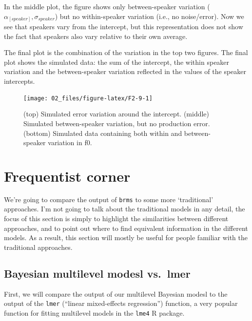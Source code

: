 \documentclass[
]{book}
\begin{document}
In the middle plot, the figure shows only between-speaker variation (\(\alpha_{[speaker]}, \sigma_{speaker}\)) but no within-speaker variation (i.e., no noise/error). Now we see that speakers vary from the intercept, but this representation does not show the fact that speakers also vary relative to their own average.

The final plot is the combination of the variation in the top two figures. The final plot shows the simulated data: the sum of the intercept, the within speaker variation and the between-speaker variation reflected in the values of the speaker intercepts.

\begin{figure}

{\centering \texttt{[image: 02\_files/figure-latex/F2-9-1]} 

}

\caption{(top) Simulated error variation around the intercept. (middle) Simulated between-speaker variation, but no production error. (bottom) Simulated data containing both within and between-speaker variation in f0.}\label{fig:F2-9}
\end{figure}

\hypertarget{frequentist-corner}{%
\section{Frequentist corner}\label{frequentist-corner}}

We're going to compare the output of \texttt{brms} to some more `traditional' approaches. I'm not going to talk about the traditional models in any detail, the focus of this section is simply to highlight the similarities between different approaches, and to point out where to find equivalent information in the different models. As a result, this section will mostly be useful for people familiar with the traditional approaches.

\hypertarget{bayesian-multilevel-modesl-vs.-lmer}{%
\subsection{Bayesian multilevel modesl vs.~lmer}\label{bayesian-multilevel-modesl-vs.-lmer}}

First, we will compare the output of our multilevel Bayesian modesl to the output of the \texttt{lmer} (``linear mixed-effects regression'') function, a very popular function for fitting multilevel models in the \texttt{lme4} R package.
\end{document}
